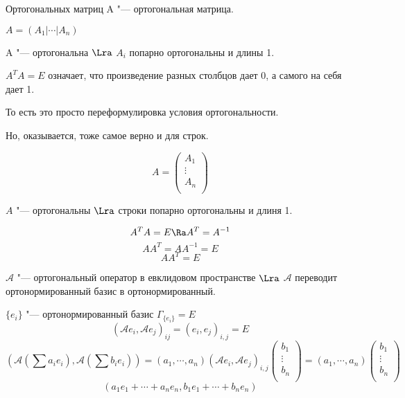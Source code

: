 \begin{conseq}{Ортогональных матриц}
A "--- ортогональная матрица. 

$A = (A_1| \cdots |A_n)$
 
A "--- ортогональна $\Lra$ $A_i$ попарно ортогональны и длины 1.

$A^TA = E$ означает, что произведение разных столбцов дает 0, а самого на себя дает 1.

То есть это просто переформулировка условия ортогональности. 

Но, оказывается, тоже самое верно и для строк. 

$$A = \begin{pmatrix} A_1\\ \vdots\\ A_n \\ \end{pmatrix}$$

$A$ "--- ортогональны $\Lra$ строки попарно ортогональны и длиня 1.

$$A^{T}A = E \Ra A^{T} = A^{-1}$$
$$AA^{T} = AA^{-1} = E$$
$$AA^T = E$$

$\mathscr{A}$ "--- ортогональный оператор в евклидовом пространстве $\Lra$ $\mathscr{A}$ переводит ортонормированный базис в ортонормированный. 

$\{e_i\}$ "--- ортонормированный базис $\Gamma_{\{e_i\}} = E$
$$(\mathscr{A}e_i, \mathscr{A}e_j)_{ij} = (e_i,e_j)_{i, j} = E$$
$$(\mathscr{A}(\sum a_ie_i), \mathscr{A}(\sum b_i e_i)) = (a_1, \cdots, a_n) (\mathscr{A}e_i, \mathscr{A}e_j)_{i, j}
\begin{pmatrix} b_1\\ \vdots\\ b_n\\ \end{pmatrix} = (a_1, \cdots, a_n) \begin{pmatrix} b_1 \\ \vdots \\ b_n\\ \end{pmatrix}$$
$$(a_1e_1 + \cdots + a_n e_n,b_1e_1 + \cdots + b_ne_n)$$
\end{conseq}

